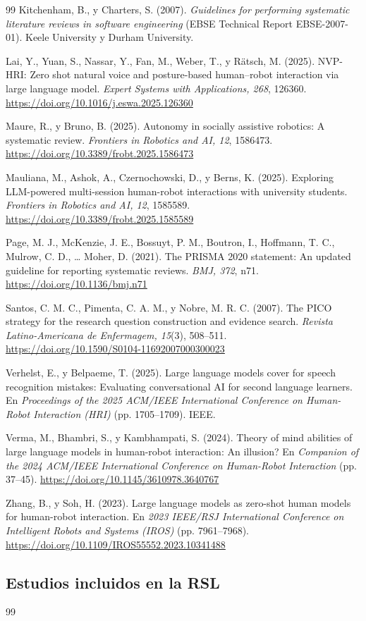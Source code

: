 \documentclass[runningheads]{llncs}
\begin{document}
\begin{thebibliography}{99}
 Kitchenham, B., y Charters, S. (2007). \textit{Guidelines for performing systematic literature reviews in software engineering} (EBSE Technical Report EBSE-2007-01). Keele University y Durham University.

 Lai, Y., Yuan, S., Nassar, Y., Fan, M., Weber, T., y Rätsch, M. (2025). NVP-HRI: Zero shot natural voice and posture-based human--robot interaction via large language model. \textit{Expert Systems with Applications, 268}, 126360. \url{https://doi.org/10.1016/j.eswa.2025.126360}

 Maure, R., y Bruno, B. (2025). Autonomy in socially assistive robotics: A systematic review. \textit{Frontiers in Robotics and AI, 12}, 1586473. \url{https://doi.org/10.3389/frobt.2025.1586473}

 Mauliana, M., Ashok, A., Czernochowski, D., y Berns, K. (2025). Exploring LLM-powered multi-session human-robot interactions with university students. \textit{Frontiers in Robotics and AI, 12}, 1585589. \url{https://doi.org/10.3389/frobt.2025.1585589}

 Page, M. J., McKenzie, J. E., Bossuyt, P. M., Boutron, I., Hoffmann, T. C., Mulrow, C. D., \ldots{} Moher, D. (2021). The PRISMA 2020 statement: An updated guideline for reporting systematic reviews. \textit{BMJ, 372}, n71. \url{https://doi.org/10.1136/bmj.n71}

 Santos, C. M. C., Pimenta, C. A. M., y Nobre, M. R. C. (2007). The PICO strategy for the research question construction and evidence search. \textit{Revista Latino-Americana de Enfermagem, 15}(3), 508--511. \url{https://doi.org/10.1590/S0104-11692007000300023}

 Verhelst, E., y Belpaeme, T. (2025). Large language models cover for speech recognition mistakes: Evaluating conversational AI for second language learners. En \textit{Proceedings of the 2025 ACM/IEEE International Conference on Human-Robot Interaction (HRI)} (pp. 1705--1709). IEEE.

 Verma, M., Bhambri, S., y Kambhampati, S. (2024). Theory of mind abilities of large language models in human-robot interaction: An illusion? En \textit{Companion of the 2024 ACM/IEEE International Conference on Human-Robot Interaction} (pp. 37--45). \url{https://doi.org/10.1145/3610978.3640767}

 Zhang, B., y Soh, H. (2023). Large language models as zero-shot human models for human-robot interaction. En \textit{2023 IEEE/RSJ International Conference on Intelligent Robots and Systems (IROS)} (pp. 7961--7968). \url{https://doi.org/10.1109/IROS55552.2023.10341488}

\end{thebibliography}
\endgroup

\subsection*{Estudios incluidos en la RSL}
\begingroup
\renewcommand{\section}[2]{}
\begin{thebibliography}{99}
\small

\end{thebibliography}
\endgroup
\end{document}
